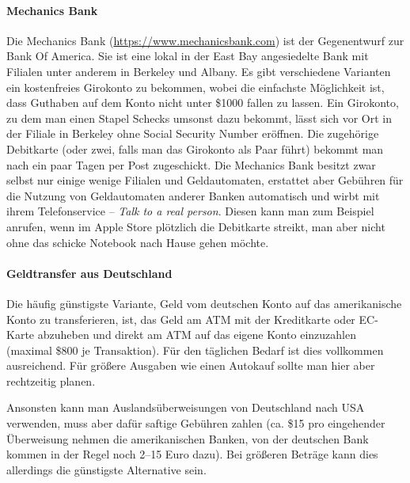 \documentclass[a4paper]{scrreprt}
\begin{document}
\paragraph{Mechanics Bank}
Die Mechanics Bank (\url{https://www.mechanicsbank.com}) ist der
Gegenentwurf zur Bank Of America. Sie ist eine lokal in der East Bay
angesiedelte Bank mit Filialen unter anderem in Berkeley und
Albany. Es gibt verschiedene Varianten ein kostenfreies Girokonto zu
bekommen, wobei die einfachste Möglichkeit ist, dass Guthaben auf dem
Konto nicht unter \$1000 fallen zu lassen. Ein Girokonto, zu dem man
einen Stapel Schecks umsonst dazu bekommt, lässt sich vor Ort in der
Filiale in Berkeley ohne Social Security Number eröffnen. Die
zugehörige Debitkarte (oder zwei, falls man das Girokonto als Paar
führt) bekommt man nach ein paar Tagen per Post zugeschickt. Die
Mechanics Bank besitzt zwar selbst nur einige wenige Filialen und
Geldautomaten, erstattet aber Gebühren für die Nutzung von
Geldautomaten anderer Banken automatisch und wirbt mit ihrem
Telefonservice -- \emph{Talk to a real person}. Diesen kann man zum
Beispiel anrufen, wenn im Apple Store plötzlich die Debitkarte
streikt, man aber nicht ohne das schicke Notebook nach Hause gehen
möchte. 
%

\paragraph{Geldtransfer aus Deutschland}

Die häufig günstigste Variante, Geld vom deutschen Konto auf das amerikanische Konto zu transferieren, ist, das Geld am ATM mit der Kreditkarte oder EC-Karte abzuheben und direkt am ATM auf das eigene Konto einzuzahlen (maximal \$800 je Transaktion). Für den täglichen Bedarf ist dies vollkommen ausreichend. Für größere Ausgaben wie einen Autokauf sollte man hier aber rechtzeitig planen.

Ansonsten kann man Auslandsüberweisungen von Deutschland nach USA verwenden, muss aber dafür saftige Gebühren zahlen (ca. \$15 pro eingehender Überweisung nehmen die amerikanischen Banken, von der deutschen Bank kommen in der Regel noch 2--15 Euro dazu). Bei größeren Beträge kann dies allerdings die günstigste Alternative sein.
\end{document}
